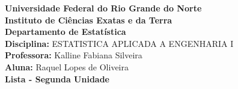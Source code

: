 \documentclass[11pt,a4paper]{report}
\title{}
\author{}
\date{}
\begin{document}
\begin{center}

\textbf{Universidade Federal do Rio Grande do Norte\\
Instituto de Ciências Exatas e da Terra\\
Departamento de Estatística\\
Disciplina:} ESTATISTICA APLICADA A ENGENHARIA I\\
\textbf{Professora: }Kalline Fabiana Silveira\\
\textbf{Aluna: }Raquel Lopes de Oliveira\\
\vspace{0.5cm}
\textbf{Lista - Segunda Unidade}\vspace{0.5cm}

\end{center}



\newpage

\end{document}
